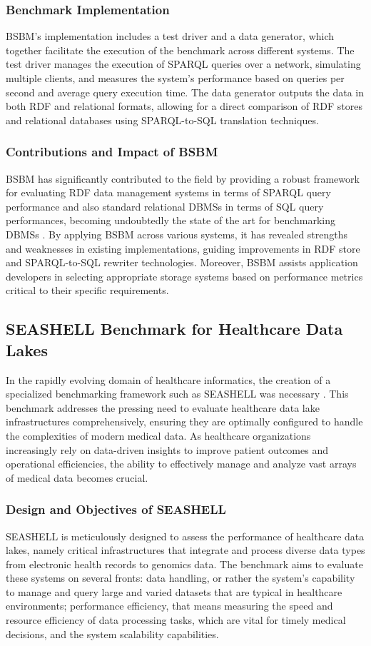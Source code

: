 \subsubsection{Benchmark Implementation}
BSBM's implementation includes a test driver and a data generator, which together facilitate the execution of the benchmark across different systems. The test driver manages the execution of \ac{SPARQL} queries over a network, simulating multiple clients, and measures the system's performance based on queries per second and average query execution time.
The data generator outputs the data in both \ac{RDF} and relational formats, allowing for a direct comparison of \ac{RDF} stores and relational databases using \ac{SPARQL}-to-SQL translation techniques.
\subsubsection{Contributions and Impact of BSBM}
\ac{BSBM} has significantly contributed to the field by providing a robust framework for evaluating \ac{RDF} data management systems in terms of \ac{SPARQL} query performance and also standard relational \ac{DBMS}s in terms of \ac{SQL} query performances, becoming undoubtedly the state of the art for benchmarking \ac{DBMS}s \cite{DBLP:conf/semweb/LantiXC16}. By applying \ac{BSBM} across various systems, it has revealed strengths and weaknesses in existing implementations, guiding improvements in \ac{RDF} store and \ac{SPARQL}-to-SQL rewriter technologies. Moreover, \ac{BSBM} assists application developers in selecting appropriate storage systems based on performance metrics critical to their specific requirements.

\subsection{SEASHELL Benchmark for Healthcare Data Lakes} \label{chp:dolci}
In the rapidly evolving domain of healthcare informatics, the creation of a specialized benchmarking framework such as \ac{SEASHELL} was necessary \cite{dolci2024tools}. This benchmark addresses the pressing need to evaluate healthcare data lake infrastructures comprehensively, ensuring they are optimally configured to handle the complexities of modern medical data. As healthcare organizations increasingly rely on data-driven insights to improve patient outcomes and operational efficiencies, the ability to effectively manage and analyze vast arrays of medical data becomes crucial.
\subsubsection{Design and Objectives of SEASHELL}
SEASHELL is meticulously designed to assess the performance of healthcare data lakes, namely critical infrastructures that integrate and process diverse data types from electronic health records to genomics data. The benchmark aims to evaluate these systems on several fronts: data handling, or rather the system's capability to manage and query large and varied datasets that are typical in healthcare environments; performance efficiency, that means measuring the speed and resource efficiency of data processing tasks, which are vital for timely medical decisions, and the system scalability capabilities.
